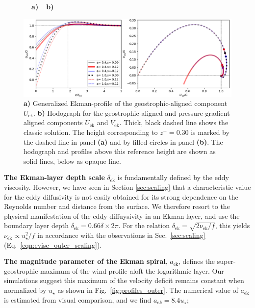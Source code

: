 \documentclass[a4paper,11pt]{amsart}
\begin{document}
\begin{figure}
  \begin{flushleft}
    \textbf{\ \ a)}\hspace{0.45\textwidth}\textbf{\ \ b)}\\
  \end{flushleft} 
  \includegraphics[width=\textwidth]{../plot/ekman_ideal.pdf}
  \caption{\label{fig:ekman_ideal}
    \textbf{a)} Generalized Ekman-profile of the geostrophic-aligned component $U_\mathrm{ek}$.
    \textbf{b)} Hodograph for the geostrophic-aligned and pressure-gradient aligned components $U_\mathrm{ek}$ and $V_\mathrm{ek}$.
    Thick, black dashed line shows the classic solution. The height corresponding to $z^-=0.30$ is marked by the dashed line in panel \textbf{(a)}
    and by filled circles in panel \textbf{(b)}. The hodograph and profiles above this reference height are
    shown as solid lines, below as opaque line.
  } 
\end{figure} 
%
\textbf{The Ekman-layer depth scale} $\delta_\mathrm{ek}$ is fundamentally defined by the eddy viscosity.
%
However, we have seen in Section \ref{sec:scaling} that a characteristic value for the eddy diffusivity
is not easily obtained for its strong dependence on the Reynolds number and distance from the surface.
%
We therefore resort to the physical manifestation of the eddy diffuysivity in an Ekman layer, and use the
boundary layer depth $\delta_\mathrm{ek} = 0.66 \delta \times 2\pi$.
%
For the relation $\delta_\mathrm{ek}=\sqrt{2\nu_\mathrm{ek}/f}$, this yields
$\nu_\mathrm{ek} \propto u_\star^2/f$ in accordance with the observations in
Sec.~\ref{sec:scaling} (Eq.~\ref{eqn:evisc_outer_scaling}). 
%
\par
%
\textbf{The magnitude parameter of the Ekman spiral}, $a_\mathrm{ek}$, defines the super-geostrophic maximum of the
wind profile aloft the logarithmic layer. Our simulations suggest this maximum of the velocity deficit
remains constant when normalized by $u_\star$ as shown in Fig.~\ref{fig:profiles_outer}.
%
The numerical value of $a_\mathrm{ek}$ is estimated from visual comparison, and we find $a_{ek}=8.4u_\star$;
\end{document}
